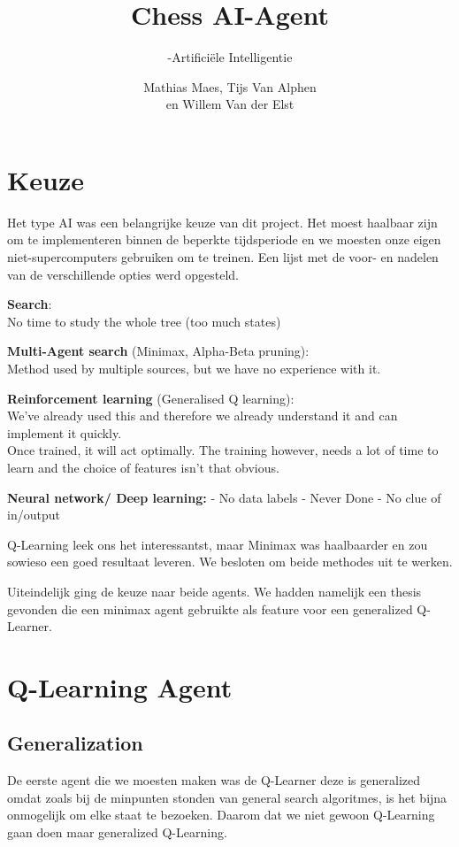 \documentclass[a4paper,openany]{uantwerpenassignment}
\title{\sffamily Chess AI-Agent}
\subtitle{\sffamily5-Artificiële Intelligentie}
\author{\sffamily Mathias Maes, Tijs Van Alphen \\en Willem Van der Elst}
\begin{document}
\sffamily
\maketitle

\tableofcontents

\chapter{Keuze}

Het type AI was een belangrijke keuze van dit project. Het moest haalbaar zijn om te implementeren binnen de beperkte tijdsperiode en we moesten onze eigen niet-supercomputers gebruiken om te treinen. Een lijst  met de voor- en nadelen van de verschillende opties werd opgesteld.


\textbf{Search}:\\
No time to study the whole tree (too much states)

\textbf{Multi-Agent search} (Minimax, Alpha-Beta pruning):\\
Method used by multiple sources, but we have no experience with it. 

\textbf{Reinforcement learning} (Generalised Q learning):\\
We've already used this and therefore we already understand it and can implement it quickly.\\
Once trained, it will act optimally. The training however, needs a lot of time to learn and the choice of features isn't that obvious.

\textbf{Neural network/ Deep learning:}
- No data labels
- Never Done
- No clue of in/output


Q-Learning leek ons het interessantst, maar Minimax was haalbaarder en zou sowieso een goed resultaat leveren. We besloten om beide methodes uit te werken. 

Uiteindelijk ging de keuze naar beide agents. We hadden namelijk een thesis\cite{rl} gevonden die een minimax agent gebruikte als feature voor een generalized Q-Learner.

\chapter{Q-Learning Agent}

\section{Generalization}

De eerste agent die we moesten maken was de Q-Learner deze is generalized omdat zoals bij de minpunten stonden van general search algoritmes, is het bijna onmogelijk om elke staat te bezoeken. Daarom dat we niet gewoon Q-Learning gaan doen maar generalized Q-Learning.
\end{document}

